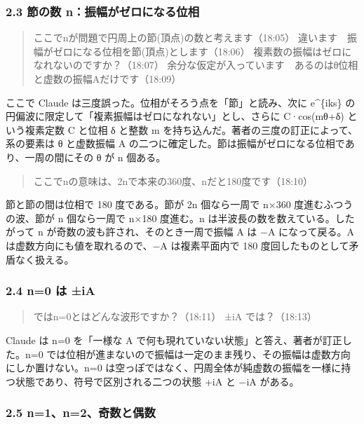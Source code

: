 \documentclass[
  a4paper,
]{ltjsarticle}
\begin{document}
\subsubsection{2.3 節の数
n：振幅がゼロになる位相}\label{ux7bc0ux306eux6570-nux632fux5e45ux304cux30bcux30edux306bux306aux308bux4f4dux76f8}

\begin{quote}
ここでnが問題で円周上の節(頂点)の数と考えます（18:05）
違います　振幅がゼロになる位相を節(頂点)とします（18:06）
複素数の振幅はゼロになれないのですか？（18:07）
余分な仮定が入っています　あるのはθ位相と虚数の振幅Aだけです（18:09）
\end{quote}

ここで Claude は三度誤った。位相がそろう点を「節」と読み、次に
e\^{}\{iks\} の円偏波に限定して「複素振幅はゼロになれない」とし、さらに
C·cos(mθ+δ) という複素定数 C と位相 δ と整数 m
を持ち込んだ。著者の三度の訂正によって、系の要素は θ と虚数振幅 A
の二つに確定した。節は振幅がゼロになる位相であり、一周の間にその θ が n
個ある。

\begin{quote}
ここでnの意味は、2nで本来の360度、nだと180度です（18:10）
\end{quote}

節と節の間は位相で 180 度である。節が 2n 個なら一周で n×360
度進むふつうの波、節が n 個なら一周で n×180 度進む。n
は半波長の数を数えている。したがって n
が奇数の波も許され、そのとき一周で振幅 A は −A になって戻る。A
は虚数方向にも値を取れるので、−A は複素平面内で 180
度回したものとして矛盾なく扱える。

\subsubsection{2.4 n=0 は ±iA}\label{n0-ux306f-ia}

\begin{quote}
ではn=0とはどんな波形ですか？（18:11） ±iA では？（18:13）
\end{quote}

Claude は n=0 を「一様な A
で何も現れていない状態」と答え、著者が訂正した。n=0
では位相が進まないので振幅は一定のまま残り、その振幅は虚数方向にしか置けない。n=0
は空っぽではなく、円周全体が純虚数の振幅を一様に持つ状態であり、符号で区別される二つの状態
+iA と −iA がある。

\subsubsection{2.5
n=1、n=2、奇数と偶数}\label{n1n2ux5947ux6570ux3068ux5076ux6570}
\end{document}
